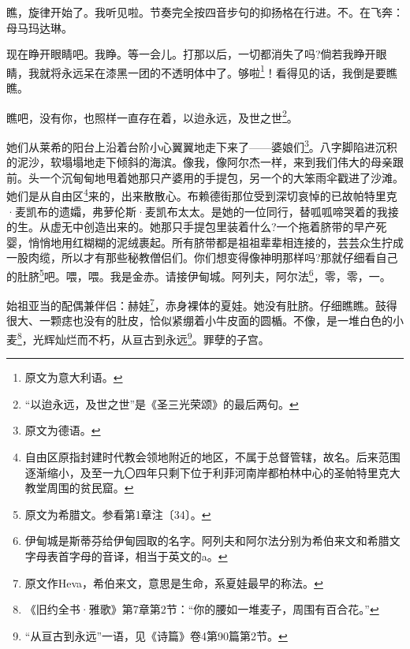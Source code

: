 \par 瞧，旋律开始了。我听见啦。节奏完全按四音步句的抑扬格在行进。不。在飞奔：母马玛达琳。
\par 现在睁开眼睛吧。我睁。等一会儿。打那以后，一切都消失了吗?倘若我睁开眼睛，我就将永远呆在漆黑一团的不透明体中了。够啦\footnote{原文为意大利语。}！看得见的话，我倒是要瞧瞧。
\par 瞧吧，没有你，也照样一直存在着，以迨永远，及世之世\footnote{“以迨永远，及世之世”是《圣三光荣颂》的最后两句。}。
\par 她们从莱希的阳台上沿着台阶小心翼翼地走下来了——婆娘们\footnote{原文为德语。}。八字脚陷进沉积的泥沙，软塌塌地走下倾斜的海滨。像我，像阿尔杰一样，来到我们伟大的母亲跟前。头一个沉甸甸地甩着她那只产婆用的手提包，另一个的大笨雨伞戳进了沙滩。她们是从自由区\footnote{自由区原指封建时代教会领地附近的地区，不属于总督管辖，故名。后来范围逐渐缩小，及至一九〇四年只剩下位于利菲河南岸都柏林中心的圣帕特里克大教堂周围的贫民窟。}来的，出来散散心。布赖德街那位受到深切哀悼的已故帕特里克·麦凯布的遗孀，弗萝伦斯·麦凯布太太。是她的一位同行，替呱呱啼哭着的我接的生。从虚无中创造出来的。她那只手提包里装着什么?一个拖着脐带的早产死婴，悄悄地用红糊糊的泥绒裹起。所有脐带都是祖祖辈辈相连接的，芸芸众生拧成一股肉缆，所以才有那些秘教僧侣们。你们想变得像神明那样吗?那就仔细看自己的肚脐\footnote{原文为希腊文。参看第1章注〔34〕。}吧。喂，喂。我是金赤。请接伊甸城。阿列夫，阿尔法\footnote{伊甸城是斯蒂芬给伊甸园取的名字。阿列夫和阿尔法分别为希伯来文和希腊文字母表首字母的音译，相当于英文的a。}，零，零，一。
\par 始祖亚当的配偶兼伴侣：赫娃\footnote{原文作Heva，希伯来文，意思是生命，系夏娃最早的称法。}，赤身裸体的夏娃。她没有肚脐。仔细瞧瞧。鼓得很大、一颗痣也没有的肚皮，恰似紧绷着小牛皮面的圆楯。不像，是一堆白色的小麦\footnote{《旧约全书·雅歌》第7章第2节：“你的腰如一堆麦子，周围有百合花。”}，光辉灿烂而不朽，从亘古到永远\footnote{“从亘古到永远”一语，见《诗篇》卷4第90篇第2节。}。罪孽的子宫。
